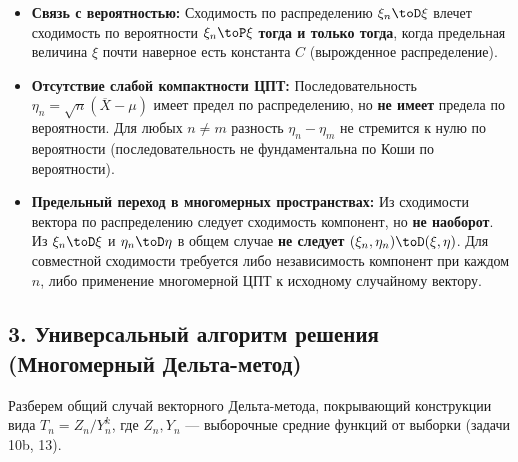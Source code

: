 \begin{itemize}
    \item \textbf{Связь с вероятностью:} Сходимость по распределению $\xi_n \toD \xi$ влечет сходимость по вероятности $\xi_n \toP \xi$ \textbf{тогда и только тогда}, когда предельная величина $\xi$ почти наверное есть константа $C$ (вырожденное распределение).
    \item \textbf{Отсутствие слабой компактности ЦПТ:} Последовательность $\eta_n = \sqrt{n}(\overline{X} - \mu)$ имеет предел по распределению, но \textbf{не имеет} предела по вероятности. Для любых $n \neq m$ разность $\eta_n - \eta_m$ не стремится к нулю по вероятности (последовательность не фундаментальна по Коши по вероятности).
    \item \textbf{Предельный переход в многомерных пространствах:} Из сходимости вектора по распределению следует сходимость компонент, но \textbf{не наоборот}. Из $\xi_n \toD \xi$ и $\eta_n \toD \eta$ в общем случае \textbf{не следует} $(\xi_n, \eta_n) \toD (\xi, \eta)$. Для совместной сходимости требуется либо независимость компонент при каждом $n$, либо применение многомерной ЦПТ к исходному случайному вектору.
\end{itemize}

\subsection*{3. Универсальный алгоритм решения (Многомерный Дельта-метод)}



Разберем общий случай векторного Дельта-метода, покрывающий конструкции вида $T_n = Z_n / Y_n^k$, где $Z_n, Y_n$ — выборочные средние функций от выборки (задачи 10b, 13).

